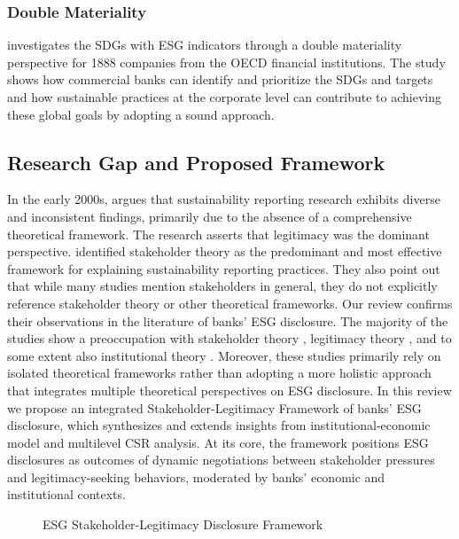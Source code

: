 \documentclass[
  authoryear]{elsarticle}
\makeatletter
\newcommand*\pandocbounded[1]{%
  \sbox\pandoc@box{#1}%
  \Gscale@div\@tempa{\textheight}{\dimexpr\ht\pandoc@box+\dp\pandoc@box\relax}%
  \Gscale@div\@tempb{\linewidth}{\wd\pandoc@box}%
  \ifdim\@tempb\p@<\@tempa\p@\let\@tempa\@tempb\fi%
  \ifdim\@tempa\p@<\p@\scalebox{\@tempa}{\usebox\pandoc@box}%
  \else\usebox{\pandoc@box}%
  \fi%
}
\makeatother
\begin{document}
\subsubsection{Double Materiality}\label{double-materiality}

\citet{ARAS2024} investigates the SDGs with ESG indicators through a
double materiality perspective for 1888 companies from the OECD
financial institutions. The study shows how commercial banks can
identify and prioritize the SDGs and targets and how sustainable
practices at the corporate level can contribute to achieving these
global goals by adopting a sound approach.

\subsection{Research Gap and Proposed
Framework}\label{research-gap-and-proposed-framework}

In the early 2000s, \citet{HOOGHIEMSTRA2000} argues that sustainability
reporting research exhibits diverse and inconsistent findings, primarily
due to the absence of a comprehensive theoretical framework. The
research asserts that legitimacy was the dominant perspective.
\citet{SPENCE2010} identified stakeholder theory as the predominant and
most effective framework for explaining sustainability reporting
practices. They also point out that while many studies mention
stakeholders in general, they do not explicitly reference stakeholder
theory or other theoretical frameworks. Our review confirms their
observations in the literature of banks' ESG disclosure. The majority of
the studies show a preoccupation with stakeholder theory
\citep{GALANT2017, SHEN2016, BUALLAY2021}, legitimacy theory
\citep[e.g.][]{CARNEVALE2014}, and to some extent also institutional
theory \citep{HIGGINS2014, BEBBINGTON2018, CHRISTENSEN2021}. Moreover,
these studies primarily rely on isolated theoretical frameworks rather
than adopting a more holistic approach that integrates multiple
theoretical perspectives on ESG disclosure. In this review we propose an
integrated Stakeholder-Legitimacy Framework of banks' ESG disclosure,
which synthesizes and extends insights from \citet{CAMPBELL2007}
institutional-economic model and \citet{AGUINIS2012} multilevel CSR
analysis. At its core, the framework positions ESG disclosures as
outcomes of dynamic negotiations between stakeholder pressures and
legitimacy-seeking behaviors, moderated by banks' economic and
institutional contexts.

\begin{figure}

\centering{

\pandocbounded{\texttt{[image: flowchart.pdf]}}

}

\caption{\label{fig-flowchart}ESG Stakeholder-Legitimacy Disclosure
Framework}

\end{figure}%
\end{document}
